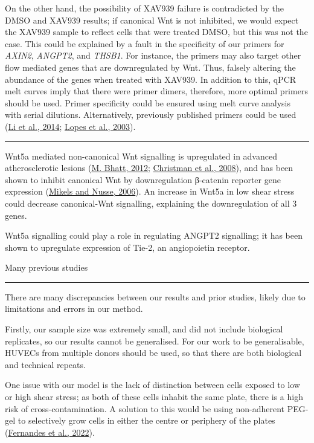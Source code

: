\documentclass[
  11pt,
]{article}
\begin{document}
On the other hand, the possibility of XAV939 failure is contradicted by the DMSO and XAV939 results; if canonical Wnt is not inhibited, we would expect the XAV939 sample to reflect cells that were treated DMSO, but this was not the case.
This could be explained by a fault in the specificity of our primers for \emph{AXIN2}, \emph{ANGPT2}, and \emph{THSB1}.
For instance, the primers may also target other flow mediated genes that are downregulated by Wnt.
Thus, falsely altering the abundance of the genes when treated with XAV939.
In addition to this, qPCR melt curves imply that there were primer dimers, therefore, more optimal primers should be used.
Primer specificity could be ensured using melt curve analysis with serial dilutions.
Alternatively, previously published primers could be used (\protect\hyperlink{ref-Li2014-mx}{Li et al., 2014}; \protect\hyperlink{ref-lopes2003}{Lopes et al., 2003}).

\begin{center}\rule{0.5\linewidth}{0.5pt}\end{center}

Wnt5a mediated non-canonical Wnt signalling is upregulated in advanced atherosclerotic lesions (\protect\hyperlink{ref-Bhatt2012}{M. Bhatt, 2012}; \protect\hyperlink{ref-Christman2008}{Christman et al., 2008}), and has been shown to inhibit canonical Wnt by downregulation β-catenin reporter gene expression (\protect\hyperlink{ref-Mikels2006}{Mikels and Nusse, 2006}).
An increase in Wnt5a in low shear stress could decrease canonical-Wnt signalling, explaining the downregulation of all 3 genes.

Wnt5a signalling could play a role in regulating ANGPT2 signalling; it has been shown to upregulate expression of Tie-2, an angiopoietin receptor.

Many previous studies

\begin{center}\rule{0.5\linewidth}{0.5pt}\end{center}

There are many discrepancies between our results and prior studies, likely due to limitations and errors in our method.

Firstly, our sample size was extremely small, and did not include biological replicates, so our results cannot be generalised.
For our work to be generalisable, HUVECs from multiple donors should be used, so that there are both biological and technical repeats.

One issue with our model is the lack of distinction between cells exposed to low or high shear stress; as both of these cells inhabit the same plate, there is a high risk of cross-contamination.
A solution to this would be using non-adherent PEG-gel to selectively grow cells in either the centre or periphery of the plates (\protect\hyperlink{ref-Fernandes2022}{Fernandes et al., 2022}).
\end{document}
